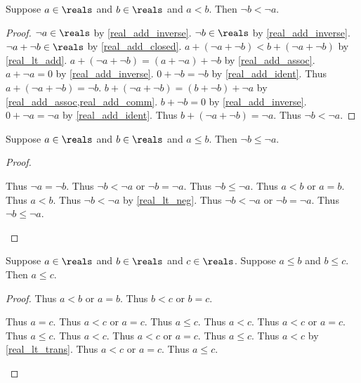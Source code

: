 \begin{theorem}\label{real_lt_neg}
    Suppose $a\in\reals$ and $b\in\reals$ and $a < b$.
    Then $\neg{b} < \neg{a}$.
\end{theorem}
\begin{proof}
    $\neg{a}\in\reals$ by \cref{real_add_inverse}.
    $\neg{b}\in\reals$ by \cref{real_add_inverse}.
    $\neg{a} + \neg{b}\in\reals$ by \cref{real_add_closed}.
    $a + (\neg{a} + \neg{b}) < b + (\neg{a} + \neg{b})$ by \cref{real_lt_add}.
    $a + (\neg{a} + \neg{b}) = (a + \neg{a}) + \neg{b}$ by \cref{real_add_assoc}.
    $a + \neg{a} = 0$ by \cref{real_add_inverse}.
    $0 + \neg{b} = \neg{b}$ by \cref{real_add_ident}.
    Thus $a + (\neg{a} + \neg{b}) = \neg{b}$.
    $b + (\neg{a} + \neg{b}) = (b + \neg{b}) + \neg{a}$ by \cref{real_add_assoc,real_add_comm}.
    $b + \neg{b} = 0$ by \cref{real_add_inverse}.
    $0 + \neg{a} = \neg{a}$ by \cref{real_add_ident}.
    Thus $b + (\neg{a} + \neg{b}) = \neg{a}$.
    Thus $\neg{b} < \neg{a}$.
\end{proof}

\begin{lemma}\label{real_leq_neg}
    Suppose $a\in\reals$ and $b\in\reals$ and $a \leq b$.
    Then $\neg{b} \leq \neg{a}$.
\end{lemma}
\begin{proof}
    \begin{byCase}
        Thus $\neg{a} = \neg{b}$.
        Thus $\neg{b} < \neg{a}$ or $\neg{b} = \neg{a}$.
        Thus $\neg{b} \leq \neg{a}$.
        Thus $a < b$ or $a = b$.
        Thus $a < b$.
        Thus $\neg{b} < \neg{a}$ by \cref{real_lt_neg}.
        Thus $\neg{b} < \neg{a}$ or $\neg{b} = \neg{a}$.
        Thus $\neg{b} \leq \neg{a}$.
    \end{byCase}
\end{proof}

\begin{lemma}\label{real_leq_trans}
    Suppose $a\in\reals$ and $b\in\reals$ and $c\in\reals$.
    Suppose $a \leq b$ and $b \leq c$.
    Then $a \leq c$.
\end{lemma}
\begin{proof}
    Thus $a < b$ or $a = b$.
    Thus $b < c$ or $b = c$.
    \begin{byCase}
        Thus $a = c$.
        Thus $a < c$ or $a = c$.
        Thus $a \leq c$.
        Thus $a < c$.
        Thus $a < c$ or $a = c$.
        Thus $a \leq c$.
        Thus $a < c$.
        Thus $a < c$ or $a = c$.
        Thus $a \leq c$.
        Thus $a < c$ by \cref{real_lt_trans}.
        Thus $a < c$ or $a = c$.
        Thus $a \leq c$.
    \end{byCase}
\end{proof}

